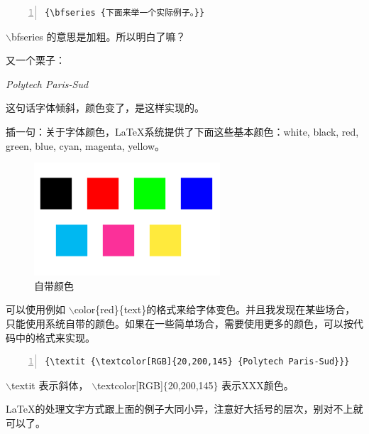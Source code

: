 \documentclass[12pt,a4paper,oneside]{book}
\begin{document}
{\cons 
\begin{lstlisting}[numbers=left, numberstyle=\tiny, keywordstyle=\color{blue!70},  frame=shadowbox, rulesepcolor=\color{red!20!green!20!blue!20}]
{\bfseries {下面来举一个实际例子。}}
\end{lstlisting}
\par
$\backslash$bfseries 的意思是加粗。所以明白了嘛？
\par
又一个栗子：
\par
{\textit {\textcolor[RGB]{20,200,145} {Polytech Paris-Sud}}}
\par
这句话字体倾斜，颜色变了，是这样实现的。
\par
插一句：关于字体颜色，\LaTeX 系统提供了下面这些基本颜色：white, black, red, green, blue, cyan, magenta, yellow。 \begin{figure}[htp] 
\centering 
\includegraphics[scale=0.85]{bc.png}
\caption{自带颜色}%
\label{pic:bc}
\end{figure}可以使用例如 $\backslash$color\{red\}\{text\}的格式来给字体变色。并且我发现在某些场合，只能使用系统自带的颜色。如果在一些简单场合，需要使用更多的颜色，可以按代码中的格式来实现。
\begin{lstlisting}[language={[ANSI]C}, numbers=left, numberstyle=\tiny, keywordstyle=\color{blue!70},  frame=shadowbox, rulesepcolor=\color{red!20!green!20!blue!20}]
{\textit {\textcolor[RGB]{20,200,145} {Polytech Paris-Sud}}}
\end{lstlisting}
\par
$\backslash$textit 表示斜体， $\backslash$textcolor[RGB]$\{$20,200,145$\}$ 表示XXX颜色。

\par
\LaTeX 的处理文字方式跟上面的例子大同小异，注意好大括号的层次，别对不上就可以了。
\vspace{2em}
}
\end{document}
